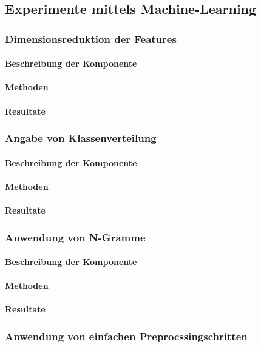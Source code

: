 \subsection{Experimente mittels Machine-Learning}
\subsubsection{Dimensionsreduktion der Features}
\paragraph{Beschreibung der Komponente}
\paragraph{Methoden}
\paragraph{Resultate}
\subsubsection{Angabe von Klassenverteilung}
\paragraph{Beschreibung der Komponente}
\paragraph{Methoden}
\paragraph{Resultate}
\subsubsection{Anwendung von N-Gramme}
\paragraph{Beschreibung der Komponente}
\paragraph{Methoden}
\paragraph{Resultate}
\subsubsection{Anwendung von einfachen Preprocssingschritten}
